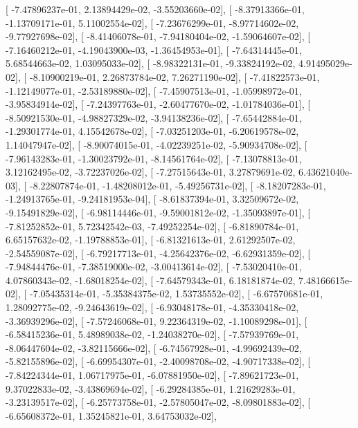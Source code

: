 \documentclass{article}
\begin{document}
       [ -7.47896237e-01,   2.13894429e-02,  -3.55203660e-02],
       [ -8.37913366e-01,  -1.13709171e-01,   5.11002554e-02],
       [ -7.23676299e-01,  -8.97714602e-02,  -9.77927698e-02],
       [ -8.41406078e-01,  -7.94180404e-02,  -1.59064607e-02],
       [ -7.16460212e-01,  -4.19043900e-03,  -1.36454953e-01],
       [ -7.64314445e-01,   5.68544663e-02,   1.03095033e-02],
       [ -8.98322131e-01,  -9.33824192e-02,   4.91495029e-02],
       [ -8.10900219e-01,   2.26873784e-02,   7.26271190e-02],
       [ -7.41822573e-01,  -1.12149077e-01,  -2.53189880e-02],
       [ -7.45907513e-01,  -1.05998972e-01,  -3.95834914e-02],
       [ -7.24397763e-01,  -2.60477670e-02,  -1.01784036e-01],
       [ -8.50921530e-01,  -4.98827329e-02,  -3.94138236e-02],
       [ -7.65442884e-01,  -1.29301774e-01,   4.15542678e-02],
       [ -7.03251203e-01,  -6.20619578e-02,   1.14047947e-02],
       [ -8.90074015e-01,  -4.02239251e-02,  -5.90934708e-02],
       [ -7.96143283e-01,  -1.30023792e-01,  -8.14561764e-02],
       [ -7.13078813e-01,   3.12162495e-02,  -3.72237026e-02],
       [ -7.27515643e-01,   3.27879691e-02,   6.43621040e-03],
       [ -8.22807874e-01,  -1.48208012e-01,  -5.49256731e-02],
       [ -8.18207283e-01,  -1.24913765e-01,  -9.24181953e-04],
       [ -8.61837394e-01,   3.32509672e-02,  -9.15491829e-02],
       [ -6.98114446e-01,  -9.59001812e-02,  -1.35093897e-01],
       [ -7.81252852e-01,   5.72342542e-03,  -7.49252254e-02],
       [ -6.81890784e-01,   6.65157632e-02,  -1.19788853e-01],
       [ -6.81321613e-01,   2.61292507e-02,  -2.54559087e-02],
       [ -6.79217713e-01,  -4.25642376e-02,  -6.62931359e-02],
       [ -7.94844476e-01,  -7.38519000e-02,  -3.00413614e-02],
       [ -7.53020410e-01,   4.07860343e-02,  -1.68018254e-02],
       [ -7.64579343e-01,   6.18181874e-02,   7.48166615e-02],
       [ -7.05435314e-01,  -5.35384375e-02,   1.53735552e-02],
       [ -6.67570681e-01,   1.28092775e-02,  -9.24643619e-02],
       [ -6.93048178e-01,  -4.35330418e-02,  -3.36939296e-02],
       [ -7.57246068e-01,   9.22364319e-02,  -1.10089298e-01],
       [ -6.58415236e-01,   5.48989038e-02,  -1.24038270e-02],
       [ -7.57939769e-01,  -8.06447604e-02,  -3.82115666e-02],
       [ -6.74567928e-01,  -4.99692439e-02,  -5.82155896e-02],
       [ -6.69954307e-01,  -2.40098708e-02,  -4.90717338e-02],
       [ -7.84224344e-01,   1.06717975e-01,  -6.07881950e-02],
       [ -7.89621723e-01,   9.37022833e-02,  -3.43869694e-02],
       [ -6.29284385e-01,   1.21629283e-01,  -3.23139517e-02],
       [ -6.25773758e-01,  -2.57805047e-02,  -8.09801883e-02],
       [ -6.65608372e-01,   1.35245821e-01,   3.64753032e-02],
\end{document}
